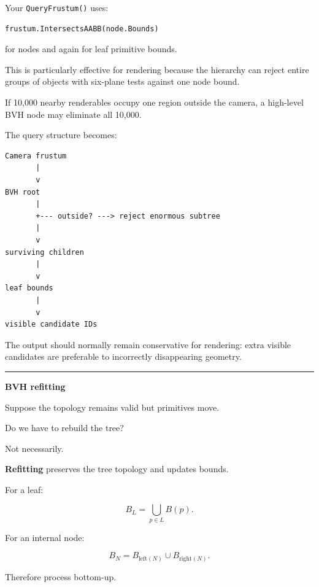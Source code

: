 Your \texttt{QueryFrustum()} uses:

\begin{verbatim}
frustum.IntersectsAABB(node.Bounds)
\end{verbatim}

for nodes and again for leaf primitive bounds.

This is particularly effective for rendering because the hierarchy can reject entire groups of objects with six-plane tests against one node bound.

If 10,000 nearby renderables occupy one region outside the camera, a high-level BVH node may eliminate all 10,000.

The query structure becomes:

\begin{verbatim}
Camera frustum
       |
       v
BVH root
       |
       +--- outside? ---> reject enormous subtree
       |
       v
surviving children
       |
       v
leaf bounds
       |
       v
visible candidate IDs
\end{verbatim}

The output should normally remain conservative for rendering: extra visible candidates are preferable to incorrectly disappearing geometry.

\begin{center}\rule{0.5\linewidth}{0.5pt}\end{center}

\textbf{BVH refitting}

Suppose the topology remains valid but primitives move.

Do we have to rebuild the tree?

Not necessarily.

\textbf{Refitting} preserves the tree topology and updates bounds.

For a leaf:

\[
B_L
=
\bigcup_{p\in L}
B(p).
\]

For an internal node:

\[
B_N=
B_{\text{left}(N)}
\cup
B_{\text{right}(N)}.
\]

Therefore process bottom-up.

